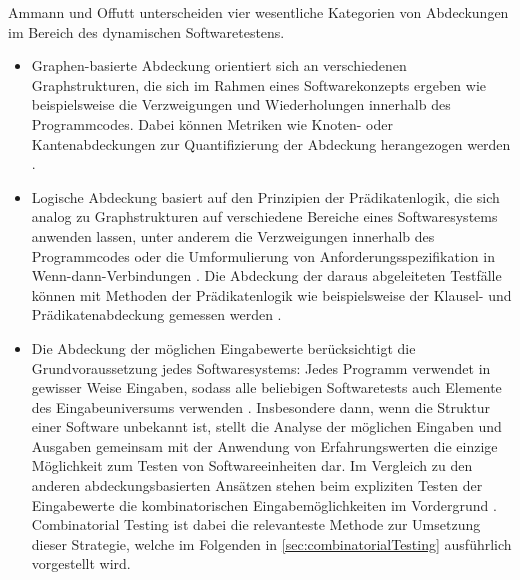 
Ammann und Offutt \cite{ammann2008introduction} unterscheiden vier wesentliche Kategorien von Abdeckungen im Bereich des dynamischen Softwaretestens. 
\begin{itemize}
\item Graphen-basierte Abdeckung orientiert sich an verschiedenen Graphstrukturen, die sich im Rahmen eines Softwarekonzepts ergeben wie beispielsweise die Verzweigungen und Wiederholungen innerhalb des Programmcodes. Dabei können Metriken wie Knoten- oder Kantenabdeckungen zur Quantifizierung der Abdeckung herangezogen werden \cite[S. 27 ff.]{ammann2008introduction}.
\item Logische Abdeckung basiert auf den Prinzipien der Prädikatenlogik, die sich analog zu Graphstrukturen auf verschiedene Bereiche eines Softwaresystems anwenden lassen, unter anderem die Verzweigungen innerhalb des Programmcodes oder die Umformulierung von Anforderungsspezifikation in Wenn-dann-Verbindungen \cite[S. 131 ff.]{ammann2008introduction}. Die Abdeckung der daraus abgeleiteten Testfälle können mit Methoden der Prädikatenlogik wie beispielsweise der Klausel- und Prädikatenabdeckung gemessen werden \cite[S. 106 ff.]{ammann2008introduction}.
\item Die Abdeckung der möglichen Eingabewerte berücksichtigt die Grundvoraussetzung jedes Softwaresystems: Jedes Programm verwendet in gewisser Weise Eingaben, sodass alle beliebigen Softwaretests auch Elemente des Eingabeuniversums verwenden \cite[S. 150]{ammann2008introduction}. Insbesondere dann, wenn die Struktur einer Software unbekannt ist, stellt die Analyse der möglichen Eingaben und Ausgaben gemeinsam mit der Anwendung von Erfahrungswerten die einzige Möglichkeit zum Testen von Softwareeinheiten dar. Im Vergleich zu den anderen abdeckungsbasierten Ansätzen stehen beim expliziten Testen der Eingabewerte die kombinatorischen Eingabemöglichkeiten im Vordergrund \cite[S. 150 ff.]{ammann2008introduction}. Combinatorial Testing ist dabei die relevanteste Methode zur Umsetzung dieser Strategie, welche im Folgenden in \autoref{sec:combinatorialTesting} ausführlich vorgestellt wird. 

\end{itemize}
